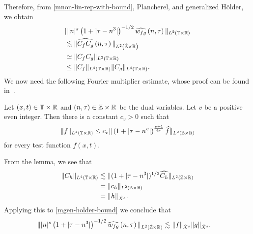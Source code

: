%
%
%
Therefore, from \eqref{mnon-lin-rep-with-bound}, Plancherel, and generalized 
H\"{o}lder, we obtain
%
%
\begin{equation}
	\label{mgen-holder-bound}
	\begin{split}
		& \| |n|^s \left( 1 + | \tau - n^3 | \right )^{-1/2}  \widehat{w_{fg}}\left( 
		n, \tau \right) \|_{L^2(\mathbb{T} \times \mathbb{R})}
		\\
		& \lesssim \|\widehat{C_f C_g }\left( n, \tau \right) 
		\|_{L^2\left( \dot{\mathbb{Z}} \times \mathbb{R} \right)}
		\\
		& \simeq \|C_f C_g \|_{L^2\left( \mathbb{T} \times \mathbb{R} \right)}
		\\
		& \le \|C_f \|_{L^4(\mathbb{T} \times \mathbb{R})} \|C_g \|_{L^4(\mathbb{T} \times \mathbb{R})}.
	\end{split}
\end{equation}
%
We now need the following Fourier multiplier estimate, whose proof can be found
in~\cite{Himonas:2001db}.
%
\begin{lemma}
	\label{mlem:four-mult-est-L4}
	Let $(x, t) \in \mathbb{T} \times \mathbb{R} $ and $(n, \tau) \in \mathbb{Z} \times \mathbb{R}$ be 
	the dual variables. Let $v$ be a positive even integer. Then there is a 
	constant $c_v > 0$ such that
%
%
\begin{equation}
	\label{mfour-mult-est-L4}
	\begin{split}
		\|f\|_{L^4(\mathbb{T} \times \mathbb{R})} \le c_v \|\left( 1 + | \tau - n^v | 
		\right)^\frac{v+1}{4v} \widehat{f} \|_{L^2( \mathbb{Z} \times \mathbb{R})}
	\end{split}
\end{equation}
for every test function $f(x, t)$. 
%
%
%
%
\end{lemma}
From the lemma, we see that
%
%
\begin{equation}
	\label{mfour-mult-conseq}
	\begin{split}
		\|C_h\|_{L^4(\mathbb{T} \times \mathbb{R})} 
		& \lesssim \|(1 + | \tau - n^3 |)^{1/2} \widehat{C_h}
		\|_{L^2(\mathbb{Z} \times \mathbb{R})}
		\\
		& = \|c_{h} \|_{L^2(\mathbb{Z} \times \mathbb{R})} 
		\\
		& = \|h \|_{\dot{X}^s}. 
	\end{split}
\end{equation}
%
%
Applying this to \eqref{mgen-holder-bound} we
conclude that
\begin{equation*}
	\begin{split}
		\| |n|^s \left( 1 + | \tau - n^3 | \right ) ^{-1/2} \widehat{w_{fg}}\left( 
		n, \tau \right) \|_{L^2(\dot{\mathbb{Z}} \times \mathbb{R})}
		& \lesssim \|f\|_{\dot{X}^s} \|g\|_{\dot{X}^s}.
	\end{split}
\end{equation*}
%
%
%
